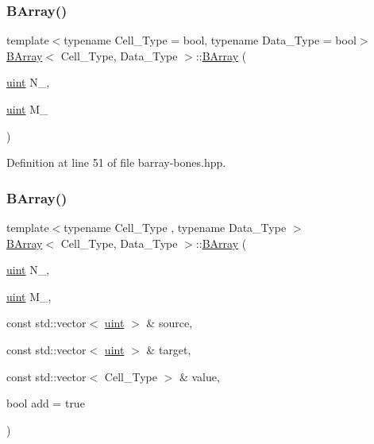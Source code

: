 \subsubsection{\texorpdfstring{B\+Array()}{BArray()}\hspace{0.1cm}{\footnotesize\ttfamily [2/5]}}
{\footnotesize\ttfamily template$<$typename Cell\+\_\+\+Type = bool, typename Data\+\_\+\+Type = bool$>$ \\
\hyperlink{class_b_array}{B\+Array}$<$ Cell\+\_\+\+Type, Data\+\_\+\+Type $>$\+::\hyperlink{class_b_array}{B\+Array} (\begin{DoxyParamCaption}\item[{\hyperlink{typedefs_8hpp_a91ad9478d81a7aaf2593e8d9c3d06a14}{uint}}]{N\+\_\+,  }\item[{\hyperlink{typedefs_8hpp_a91ad9478d81a7aaf2593e8d9c3d06a14}{uint}}]{M\+\_\+ }\end{DoxyParamCaption})\hspace{0.3cm}{\ttfamily [inline]}}



Definition at line 51 of file barray-\/bones.\+hpp.

\mbox{\label{class_b_array_a098b6170a1ea4b2a8e0832d1163e9ed1}} 
\subsubsection{\texorpdfstring{B\+Array()}{BArray()}\hspace{0.1cm}{\footnotesize\ttfamily [3/5]}}
{\footnotesize\ttfamily template$<$typename Cell\+\_\+\+Type , typename Data\+\_\+\+Type $>$ \\
\hyperlink{class_b_array}{B\+Array}$<$ Cell\+\_\+\+Type, Data\+\_\+\+Type $>$\+::\hyperlink{class_b_array}{B\+Array} (\begin{DoxyParamCaption}\item[{\hyperlink{typedefs_8hpp_a91ad9478d81a7aaf2593e8d9c3d06a14}{uint}}]{N\+\_\+,  }\item[{\hyperlink{typedefs_8hpp_a91ad9478d81a7aaf2593e8d9c3d06a14}{uint}}]{M\+\_\+,  }\item[{const std\+::vector$<$ \hyperlink{typedefs_8hpp_a91ad9478d81a7aaf2593e8d9c3d06a14}{uint} $>$ \&}]{source,  }\item[{const std\+::vector$<$ \hyperlink{typedefs_8hpp_a91ad9478d81a7aaf2593e8d9c3d06a14}{uint} $>$ \&}]{target,  }\item[{const std\+::vector$<$ Cell\+\_\+\+Type $>$ \&}]{value,  }\item[{bool}]{add = {\ttfamily true} }\end{DoxyParamCaption})\hspace{0.3cm}{\ttfamily [inline]}}



